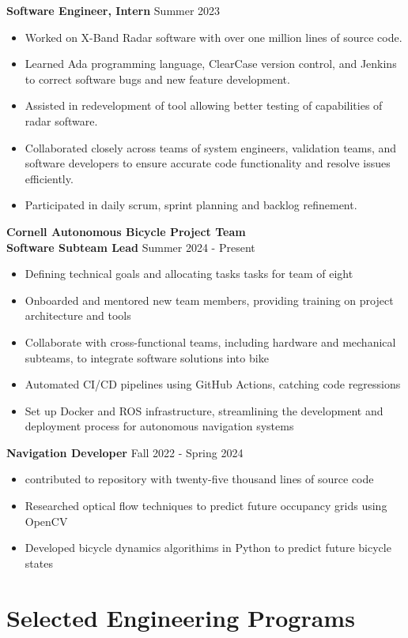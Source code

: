 \documentclass[letterpaper,8pt]{article}
\newcommand{\company}[1]{
    \vspace{4pt}
    \large \textbf{#1}
    \\
}
\newcommand{\position}[2]{
    \vspace{2pt}
    \normalsize \textbf {#1}
    \hfill {\small #2}
    \\
    \normalsize
}
\newcommand{\itemsBegin}{
    \begin{itemize}[leftmargin=0.2in, labelsep=0.05in, itemsep=0pt, parsep=1pt, topsep=0pt, partopsep=0pt]
}
\newcommand{\itemsEnd}{\end{itemize}}
\begin{document}
    \position{Software Engineer, Intern}{Summer 2023}
    \itemsBegin
        \item Worked on X-Band Radar software with over one million lines of source code.
        \item Learned Ada programming language, ClearCase version control, and Jenkins to correct software bugs and new feature development.
        \item Assisted in redevelopment of tool allowing better testing of capabilities of radar software.
        \item Collaborated closely across teams of system engineers, validation teams, and software developers to ensure accurate code functionality and resolve issues efficiently.
        \item Participated in daily scrum, sprint planning and backlog refinement.
    \itemsEnd

    \company{Cornell Autonomous Bicycle Project Team}
    \position{Software Subteam Lead}{Summer 2024 - Present}

    \itemsBegin
        \item Defining technical goals and allocating tasks tasks for team of eight
        \item Onboarded and mentored new team members, providing training on project architecture and tools
        \item Collaborate with cross-functional teams, including hardware and mechanical subteams, to integrate software solutions into bike
        \item Automated CI/CD pipelines using GitHub Actions, catching code regressions
        \item Set up Docker and ROS infrastructure, streamlining the development and deployment process for autonomous navigation systems
    \itemsEnd

    \position{Navigation Developer}{Fall 2022 - Spring 2024}
    \itemsBegin
        \item contributed to repository with twenty-five thousand lines of source code
        \item Researched optical flow techniques to predict future occupancy grids using OpenCV
        \item Developed bicycle dynamics algorithims in Python to predict future bicycle states
    \itemsEnd

\section{Selected Engineering Programs}
\end{document}
